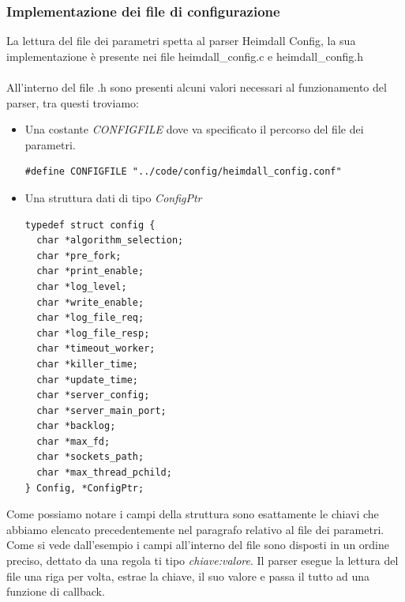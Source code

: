 \documentclass[italian]{tktltiki2}
\begin{document}
\subsubsection{Implementazione dei file di configurazione}
\label{ssec:file_config_impl}

La lettura del file dei parametri spetta al parser Heimdall Config, la sua implementazione è presente nei file heimdall\_config.c e heimdall\_config.h
\\
\\
All'interno del file .h sono presenti alcuni valori necessari al funzionamento del parser, tra questi troviamo:

\begin{itemize}

\item Una costante \emph{CONFIGFILE} dove va specificato il percorso del file dei parametri.
  
\begin{lstlisting}
#define CONFIGFILE "../code/config/heimdall_config.conf"
\end{lstlisting}
  
\item Una struttura dati di tipo \emph{ConfigPtr}

\begin{lstlisting}
typedef struct config {
  char *algorithm_selection;
  char *pre_fork;
  char *print_enable;
  char *log_level;
  char *write_enable;
  char *log_file_req;
  char *log_file_resp;
  char *timeout_worker;
  char *killer_time;
  char *update_time;
  char *server_config;
  char *server_main_port;
  char *backlog;
  char *max_fd;
  char *sockets_path;
  char *max_thread_pchild;
} Config, *ConfigPtr;  
\end{lstlisting}


\end{itemize}
Come possiamo notare i campi della struttura sono esattamente le chiavi che abbiamo elencato precedentemente nel paragrafo relativo al file dei parametri. Come si vede dall'esempio i campi all'interno del file sono disposti in un ordine preciso, dettato da una regola ti tipo \emph{chiave:valore}. Il parser esegue la lettura del file una riga per volta, estrae la chiave, il suo valore e passa il tutto ad una funzione di callback.
\end{document}
